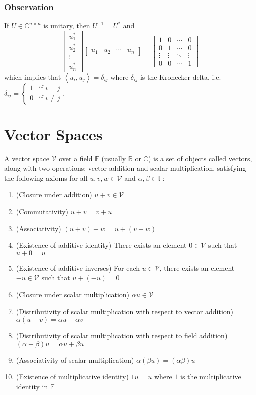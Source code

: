 \documentclass[11pt]{article}
\newcommand{\inner}[2]{\left\langle #1, #2 \right\rangle}
\begin{document}
\subsubsection*{Observation}
If $U \in \mathbb{C}^{n \times n}$ is unitary, then $U^{-1} = U^*$ and 
\[\begin{bmatrix}
    u_1^* \\
    u_2^* \\
    \vdots \\
    u_n^*
\end{bmatrix} \begin{bmatrix}
    u_1 & u_2 & \cdots & u_n
\end{bmatrix} = \begin{bmatrix}
    1 & 0 & \cdots & 0 \\
    0 & 1 & \cdots & 0 \\
    \vdots & \vdots & \ddots & \vdots \\
    0 & 0 & \cdots & 1
\end{bmatrix}
\] 
which implies that $\inner{u_i}{u_j} = \delta_{ij}$ where $\delta_{ij}$ is the Kronecker delta, i.e. $\delta_{ij} = \begin{cases}
1 & \text{if } i = j \\
0 & \text{if } i \neq j
\end{cases}$.

\section{Vector Spaces}
A vector space $\mathcal{V}$ over a field $\mathbb{F}$ (usually $\mathbb{R}$ or $\mathbb{C}$) is a set of objects called vectors, along with two operations: vector addition and scalar multiplication, satisfying the following axioms for all $u, v, w \in \mathcal{V}$ and $\alpha, \beta \in \mathbb{F}$:
\begin{enumerate}
    \item (Closure under addition) $u + v \in \mathcal{V}$
    \item (Commutativity) $u + v = v + u$
    \item (Associativity) $(u + v) + w = u + (v + w)$
    \item (Existence of additive identity) There exists an element $0 \in \mathcal{V}$ such that $u + 0 = u$
    \item (Existence of additive inverses) For each $u \in \mathcal{V}$, there exists an element $-u \in \mathcal{V}$ such that $u + (-u) = 0$
    \item (Closure under scalar multiplication) $\alpha u \in \mathcal{V}$
    \item (Distributivity of scalar multiplication with respect to vector addition) $\alpha (u + v) = \alpha u + \alpha v$
    \item (Distributivity of scalar multiplication with respect to field addition) $(\alpha + \beta) u = \alpha u + \beta u$
    \item (Associativity of scalar multiplication) $\alpha (\beta u) = (\alpha \beta) u$
    \item (Existence of multiplicative identity) $1 u = u$ where $1$ is the multiplicative identity in $\mathbb{F}$
\end{enumerate}
\end{document}
